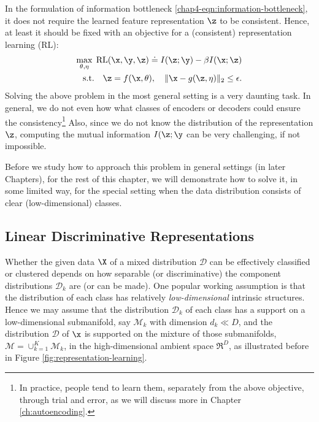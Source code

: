 \documentclass[../../book-main.tex]{subfiles}
\begin{document}
In the formulation of information bottleneck \eqref{chap4-eqn:information-bottleneck}, it does not require the learned feature representation $\z$ to be consistent. Hence, at least it should be fixed with an objective for a (consistent) representation learning (RL):
\begin{eqnarray}
	\max_{\theta,\eta}\; \mbox{RL}(\x, \y, \z) \doteq I(\z; \y) - \beta I(\x; \z) \nonumber \\ \mathrm{s.t.}\quad  \z = f(\x,\theta),\quad  \|\x - g(\z, \eta) \|_2 \le \epsilon. 
	\label{chap4-eqn:representation-learning}
\end{eqnarray}
Solving the above problem in the most general setting is a very daunting task. In general, we do not even how what classes of encoders or decoders could ensure the consistency\footnote{In practice, people tend to learn them, separately from the above objective, through trial and error, as we will discuss more in Chapter \ref{ch:autoencoding}.} Also, since we do not know the distribution of the representation $\z$, computing the mutual information $I(\z;\y$ can be very challenging, if not impossible.

Before we study how to approach this problem in general settings (in later Chapters), for the rest of this chapter, we will demonstrate how to solve it, in some limited way, for the special setting when the data distribution consists of clear (low-dimensional) classes.


\subsection{Linear Discriminative Representations}\label{subsec:LDR}

Whether the given data $\X$ of a mixed distribution $\mathcal{D}$ can be effectively classified or clustered depends on how separable (or discriminative) the component distributions $\mathcal{D}_k$ are (or can be made). One popular working assumption is that the distribution of each class has relatively {\em low-dimensional} intrinsic structures. Hence we may assume that the distribution $\mathcal{D}_k$ of each class has a support on a low-dimensional submanifold, say $\mathcal{M}_k$ with dimension $d_k \ll D$, and the distribution $\mathcal D$ of $\x$ is supported on the mixture of those submanifolds, $\mathcal M = \cup_{k=1}^K \mathcal{M}_k$,  in the high-dimensional ambient space $\Re^D$, as illustrated before in Figure \ref{fig:representation-learning}.
\end{document}
